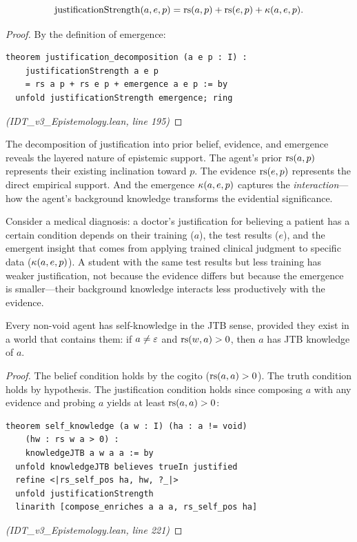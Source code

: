 \begin{theorem}
\label{thm:justification-decomp}
\[
  \mathrm{justificationStrength}(a, e, p) = \mathrm{rs}(a, p) + \mathrm{rs}(e, p) + \kappa(a, e, p).
\]
\end{theorem}

\begin{proof}
By the definition of emergence:
\begin{lstlisting}
theorem justification_decomposition (a e p : I) :
    justificationStrength a e p
    = rs a p + rs e p + emergence a e p := by
  unfold justificationStrength emergence; ring
\end{lstlisting}
\textit{(IDT\_v3\_Epistemology.lean, line 195)}
\end{proof}

\begin{interpretation}
The decomposition of justification into prior belief, evidence, and emergence
reveals the layered nature of epistemic support. The agent's prior $\mathrm{rs}(a, p)$
represents their existing inclination toward $p$. The evidence $\mathrm{rs}(e, p)$
represents the direct empirical support. And the emergence $\kappa(a, e, p)$
captures the \emph{interaction}---how the agent's background knowledge transforms
the evidential significance.

Consider a medical diagnosis: a doctor's justification for believing a patient has
a certain condition depends on their training ($a$), the test results ($e$), and
the emergent insight that comes from applying trained clinical judgment to specific
data ($\kappa(a, e, p)$). A student with the same test results but less training
has weaker justification, not because the evidence differs but because the emergence
is smaller---their background knowledge interacts less productively with the evidence.
\end{interpretation}

\begin{theorem}
\label{thm:self-knowledge}
Every non-void agent has self-knowledge in the JTB sense, provided they exist in
a world that contains them: if $a \neq \varepsilon$ and $\mathrm{rs}(w, a) > 0$, then
$a$ has JTB knowledge of $a$.
\end{theorem}

\begin{proof}
The belief condition holds by the cogito ($\mathrm{rs}(a, a) > 0$). The truth condition
holds by hypothesis. The justification condition holds since composing $a$ with
any evidence and probing $a$ yields at least $\mathrm{rs}(a, a) > 0$:
\begin{lstlisting}
theorem self_knowledge (a w : I) (ha : a != void)
    (hw : rs w a > 0) :
    knowledgeJTB a w a a := by
  unfold knowledgeJTB believes trueIn justified
  refine <|rs_self_pos ha, hw, ?_|>
  unfold justificationStrength
  linarith [compose_enriches a a a, rs_self_pos ha]
\end{lstlisting}
\textit{(IDT\_v3\_Epistemology.lean, line 221)}
\end{proof}

